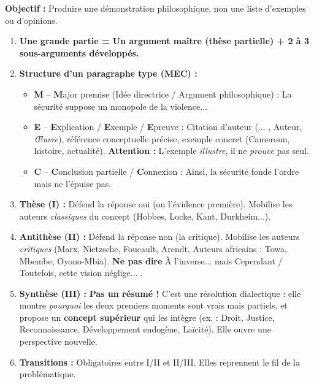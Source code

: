 \documentclass[11pt]{article}
\newcommand{\cle}[1]{{\popxbold\color{popdark}#1}}
\begin{document}
\begin{methode}
    \textbf{Objectif :} Produire une démonstration philosophique, non une liste d'exemples ou d'opinions.
    \begin{enumerate}
        \item \textbf{Une grande partie = Un argument maître (thèse partielle) + 2 à 3 sous-arguments développés.}
        \item \textbf{Structure d'un paragraphe type (MEC) :}
        \begin{itemize}
            \item \textbf{M} -- \textbf{M}ajor premise (Idée directrice / Argument philosophique) : \guillemotleft La sécurité suppose un monopole de la violence... \guillemotright
            \item \textbf{E} -- \textbf{E}xplication / \textbf{E}xemple / \textbf{E}preuve : Citation d'auteur (\guillemotleft ... \guillemotright, Auteur, \emph{Œuvre}), référence conceptuelle précise, exemple concret (Cameroun, histoire, actualité). \textbf{Attention :} L'exemple \emph{illustre}, il ne \emph{prouve} pas seul.
            \item \textbf{C} -- \textbf{C}onclusion partielle / \textbf{C}onnexion : \guillemotright Ainsi, la sécurité fonde l'ordre mais ne l'épuise pas. \guillemotright
        \end{itemize}
        \item \textbf{Thèse (I) :} Défend la réponse \guillemotleft oui \guillemotright (ou l'évidence première). Mobilise les auteurs \emph{classiques} du concept (Hobbes, Locke, Kant, Durkheim...).
        \item \textbf{Antithèse (II) :} Défend la réponse \guillemotleft non \guillemotright (la critique). Mobilise les auteurs \emph{critiques} (Marx, Nietzsche, Foucault, Arendt, Auteurs africains : Towa, Mbembe, Oyono-Mbia). \textbf{Ne pas dire} \guillemotleft À l'inverse... \guillemotright mais \guillemotleft Cependant / Toutefois, cette vision néglige... \guillemotright.
        \item \textbf{Synthèse (III) :} \textbf{Pas un résumé !} C'est une \cle{résolution dialectique} : elle montre \emph{pourquoi} les deux premiers moments sont vrais mais partiels, et propose un \textbf{concept supérieur} qui les intègre (ex. : \cle{Droit}, \cle{Justice}, \cle{Reconnaissance}, \cle{Développement endogène}, \cle{Laïcité}). Elle ouvre une perspective nouvelle.
        \item \textbf{Transitions :} Obligatoires entre I/II et II/III. Elles reprennent le fil de la problématique.
    \end{enumerate}
\end{methode}
\end{document}
